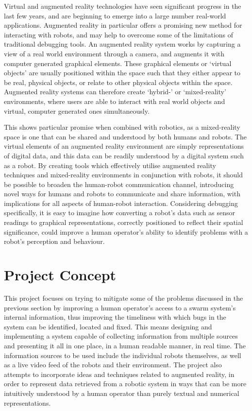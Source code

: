 Virtual and augmented reality technologies have seen significant progress in the last few years, and are beginning to emerge into a large number real-world applications. Augmented reality in particular offers a promising new method for interacting with robots, and may help to overcome some of the limitations of traditional debugging tools. An augmented reality system works by capturing a view of a real world environment through a camera, and augments it with computer generated graphical elements. These graphical elements or `virtual objects' are usually positioned within the space such that they either appear to be real, physical objects, or relate to other physical objects within the space. Augmented reality systems can therefore create `hybrid-' or `mixed-reality' environments, where users are able to interact with real world objects and virtual, computer generated ones simultaneously. 

This shows particular promise when combined with robotics, as a mixed-reality space is one that can be shared and understood by both humans and robots. The virtual elements of an augmented reality environment are simply representations of digital data, and this data can be readily understood by a digital system such as a robot. By creating tools which effectively utilise augmented reality techniques and mixed-reality environments in conjunction with robots, it should be possible to broaden the human-robot communication channel, introducing novel ways for humans and robots to communicate and share information, with implications for all aspects of human-robot interaction. Considering debugging specifically, it is easy to imagine how converting a robot's data such as sensor readings to graphical representations, correctly positioned to reflect their spatial significance, could improve a human operator's ability to identify problems with a robot's perception and behaviour.


\section{Project Concept} \label{ProjectConcept}
This project focuses on trying to mitigate some of the problems discussed in the previous section by improving a human operator's access to a swarm system's internal information, thus improving the timeliness with which bugs in the system can be identified, located and fixed. This means designing and implementing a system capable of collecting information from multiple sources and presenting it all in one place, in a human readable manner, in real time. The information sources to be used include the individual robots themselves, as well as a live video feed of the robots and their environment. The project also attempts to incorporate ideas and techniques related to augmented reality, in order to represent data retrieved from a robotic system in ways that can be more intuitively understood by a human operator than purely textual and numerical representations.

